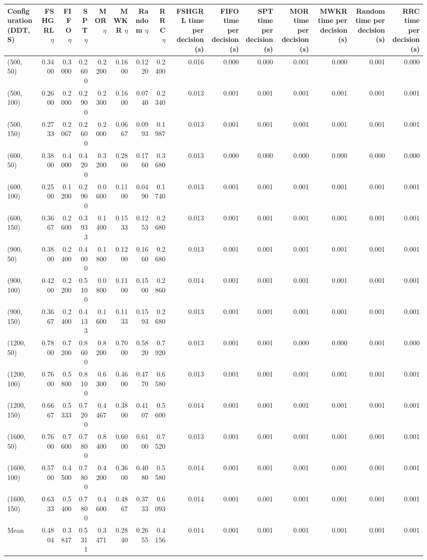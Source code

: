 \begin{tabular}{lrrrrrrrrrrrrrr}
\toprule
Configuration (DDT, S) & FSHGRL $\eta$ & FIFO $\eta$ & SPT $\eta$ & MOR $\eta$ & MWKR $\eta$ & Random $\eta$ & RRC $\eta$ & FSHGRL time per decision (s) & FIFO time per decision (s) & SPT time per decision (s) & MOR time per decision (s) & MWKR time per decision (s) & Random time per decision (s) & RRC time per decision (s) \\
\midrule
(500, 50) & 0.3400 & 0.3000 & 0.2600 & 0.2200 & 0.1600 & 0.1220 & 0.2400 & 0.016 & 0.000 & 0.000 & 0.001 & 0.000 & 0.001 & 0.000 \\
(500, 100) & 0.2600 & 0.2000 & 0.2900 & 0.2300 & 0.1600 & 0.0740 & 0.2340 & 0.013 & 0.001 & 0.001 & 0.001 & 0.001 & 0.001 & 0.001 \\
(500, 150) & 0.2733 & 0.2067 & 0.2600 & 0.2000 & 0.0667 & 0.0993 & 0.1987 & 0.013 & 0.001 & 0.001 & 0.001 & 0.001 & 0.001 & 0.001 \\
(600, 50) & 0.3800 & 0.4000 & 0.4200 & 0.3200 & 0.2800 & 0.1760 & 0.3680 & 0.013 & 0.000 & 0.000 & 0.000 & 0.000 & 0.000 & 0.000 \\
(600, 100) & 0.2500 & 0.1200 & 0.2900 & 0.0600 & 0.1100 & 0.0490 & 0.1740 & 0.013 & 0.001 & 0.001 & 0.001 & 0.001 & 0.001 & 0.001 \\
(600, 150) & 0.3667 & 0.2600 & 0.3933 & 0.1400 & 0.1533 & 0.1253 & 0.2680 & 0.013 & 0.001 & 0.001 & 0.001 & 0.001 & 0.001 & 0.001 \\
(900, 50) & 0.3800 & 0.2400 & 0.4000 & 0.1800 & 0.1200 & 0.1660 & 0.2680 & 0.013 & 0.001 & 0.001 & 0.001 & 0.001 & 0.001 & 0.001 \\
(900, 100) & 0.4200 & 0.2200 & 0.5100 & 0.0800 & 0.1100 & 0.1500 & 0.2860 & 0.014 & 0.001 & 0.001 & 0.001 & 0.001 & 0.001 & 0.001 \\
(900, 150) & 0.3667 & 0.2400 & 0.4133 & 0.1600 & 0.1133 & 0.1593 & 0.2680 & 0.013 & 0.001 & 0.001 & 0.001 & 0.001 & 0.001 & 0.001 \\
(1200, 50) & 0.7800 & 0.7200 & 0.8600 & 0.8200 & 0.7000 & 0.5820 & 0.7920 & 0.013 & 0.001 & 0.001 & 0.000 & 0.000 & 0.001 & 0.000 \\
(1200, 100) & 0.7600 & 0.5800 & 0.8100 & 0.6300 & 0.4600 & 0.4770 & 0.6580 & 0.013 & 0.001 & 0.001 & 0.001 & 0.001 & 0.001 & 0.001 \\
(1200, 150) & 0.6667 & 0.5333 & 0.7200 & 0.4467 & 0.3800 & 0.4107 & 0.5600 & 0.014 & 0.001 & 0.001 & 0.001 & 0.001 & 0.001 & 0.001 \\
(1600, 50) & 0.7600 & 0.7600 & 0.7800 & 0.8400 & 0.6000 & 0.6100 & 0.7520 & 0.013 & 0.001 & 0.001 & 0.001 & 0.001 & 0.001 & 0.001 \\
(1600, 100) & 0.5700 & 0.4500 & 0.7800 & 0.4200 & 0.3600 & 0.4080 & 0.5580 & 0.014 & 0.001 & 0.001 & 0.001 & 0.001 & 0.001 & 0.001 \\
(1600, 150) & 0.6333 & 0.5400 & 0.7800 & 0.4600 & 0.4867 & 0.3733 & 0.6093 & 0.014 & 0.001 & 0.001 & 0.001 & 0.001 & 0.001 & 0.001 \\
Mean & 0.4804 & 0.3847 & 0.5311 & 0.3471 & 0.2840 & 0.2655 & 0.4156 & 0.014 & 0.001 & 0.001 & 0.001 & 0.001 & 0.001 & 0.001 \\
\bottomrule
\end{tabular}
